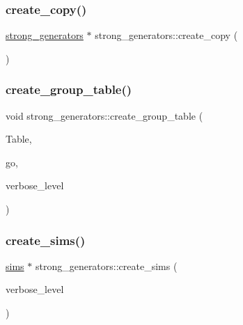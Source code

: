 \mbox{\label{classstrong__generators_ae8c60a4267aedfe7ba379fb939bd9853}} 
\subsubsection{\texorpdfstring{create\+\_\+copy()}{create\_copy()}}
{\footnotesize\ttfamily \mbox{\hyperlink{classstrong__generators}{strong\+\_\+generators}} $\ast$ strong\+\_\+generators\+::create\+\_\+copy (\begin{DoxyParamCaption}{ }\end{DoxyParamCaption})}

\mbox{\label{classstrong__generators_a71a070c14d4a951cbf7de836e5d8d1be}} 
\subsubsection{\texorpdfstring{create\+\_\+group\+\_\+table()}{create\_group\_table()}}
{\footnotesize\ttfamily void strong\+\_\+generators\+::create\+\_\+group\+\_\+table (\begin{DoxyParamCaption}\item[{\mbox{\hyperlink{galois_8h_a09fddde158a3a20bd2dcadb609de11dc}{I\+NT}} $\ast$\&}]{Table,  }\item[{\mbox{\hyperlink{galois_8h_a09fddde158a3a20bd2dcadb609de11dc}{I\+NT}} \&}]{go,  }\item[{\mbox{\hyperlink{galois_8h_a09fddde158a3a20bd2dcadb609de11dc}{I\+NT}}}]{verbose\+\_\+level }\end{DoxyParamCaption})}

\mbox{\label{classstrong__generators_afca700d50772a39eeb74239355ae67e1}} 
\subsubsection{\texorpdfstring{create\+\_\+sims()}{create\_sims()}}
{\footnotesize\ttfamily \mbox{\hyperlink{classsims}{sims}} $\ast$ strong\+\_\+generators\+::create\+\_\+sims (\begin{DoxyParamCaption}\item[{\mbox{\hyperlink{galois_8h_a09fddde158a3a20bd2dcadb609de11dc}{I\+NT}}}]{verbose\+\_\+level }\end{DoxyParamCaption})}

